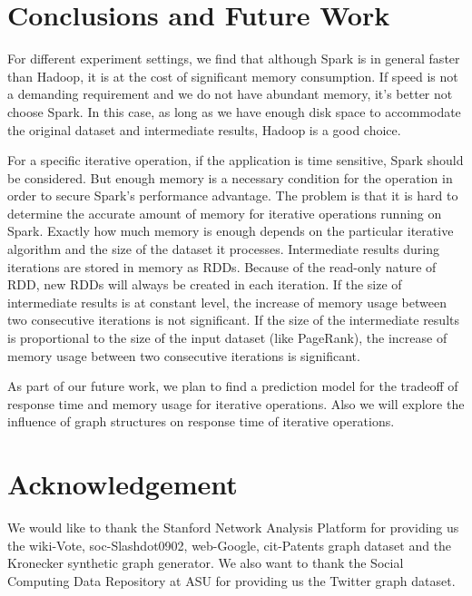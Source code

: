 \documentclass[10pt,conference,compsocconf]{IEEEtran}
\begin{document}
\section{Conclusions and Future Work}
\label{sec:concl_fw}

For different experiment settings,  we find that although Spark is in general faster than Hadoop, it is at the cost of significant memory consumption. If speed is not a demanding requirement and we do not have abundant memory, it's better not choose Spark.  In this case, as long as we have enough disk space to accommodate the original dataset and intermediate results, Hadoop is a good choice.

For a specific iterative operation, if the application is time sensitive, Spark should be considered. But  enough memory is a necessary condition for the operation in order to secure Spark's performance advantage. The problem is that it is hard to determine the accurate amount of memory for iterative operations running on Spark. Exactly how much memory is enough depends on the particular iterative algorithm and the size of the dataset it processes. Intermediate results during iterations are stored in memory as RDDs. Because of the read-only nature of RDD, new RDDs will always be created in each iteration. If the size of intermediate results is at constant level, the increase of memory usage between two consecutive iterations is not significant. If the size of the intermediate results is proportional to the size of the input dataset (like PageRank), the increase of memory usage between two consecutive iterations is significant.

As part of our future work, we plan to find a prediction model for the tradeoff of response time and memory usage for iterative operations. Also we will explore the influence of graph structures on response time of iterative operations.


\section*{Acknowledgement}
We would like to thank the Stanford Network Analysis Platform\cite{url_snap} for providing us the wiki-Vote, soc-Slashdot0902, web-Google, cit-Patents graph dataset and the Kronecker synthetic graph generator. We also want to thank the Social Computing Data Repository at ASU\cite{zafarani2009} for providing us the Twitter graph dataset\cite{url_twitter_dataset}. 
\end{document}
